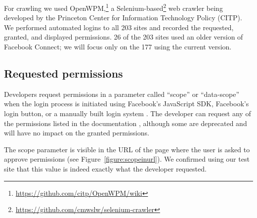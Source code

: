 \documentclass{sig-alternate}
\begin{document}
For crawling we used OpenWPM,\footnote{\url{https://github.com/citp/OpenWPM/wiki}} a Selenium-based\footnote{\url{https://github.com/cmwslw/selenium-crawler}} web crawler being developed by the Princeton Center for Information Technology Policy (CITP). 
We performed automated logins to all 203 sites and recorded the requested, granted, and displayed permissions.
26 of the 203 sites used an older version of Facebook Connect; we will focus only on the 177 using the current version.

\subsection{Requested permissions}

Developers request permissions in a parameter called ``scope'' or ``data-scope'' when the login process is initiated using Facebook's JavaScript SDK, Facebook's login button, or a manually built login system \cite{fbpermsinstructions}.
The developer can request any of the permissions listed in the documentation \cite{fbpermissions}, although some are deprecated and will have no impact on the granted permissions.%

The scope parameter is visible in the URL of the page where the user is asked to approve permissions (see Figure~\ref{figure:scopeinurl}).
We confirmed using our test site that this value is indeed exactly what the developer requested.
\end{document}

